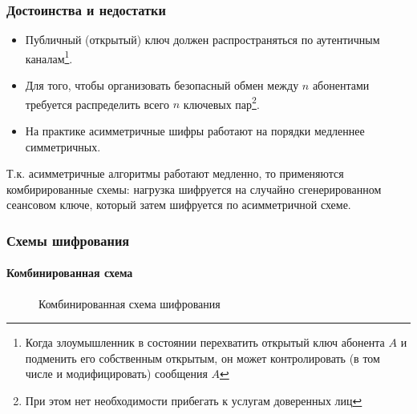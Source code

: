 \begin{frame}
    \frametitle{Достоинства и недостатки}
    
    \begin{itemize}
        \item Публичный (открытый) ключ должен распространяться по аутентичным каналам\footnote{Когда злоумышленник в состоянии перехватить открытый ключ абонента $A$ и подменить его собственным открытым, он может контролировать (в том числе и модифицировать) сообщения $A$}.
        \item Для того, чтобы организовать безопасный обмен между $n$ абонентами требуется распределить всего $n$ ключевых пар\footnote{При этом нет необходимости прибегать к услугам доверенных лиц}.
        \item На практике асимметричные шифры работают на порядки медленнее симметричных.
    \end{itemize}
\end{frame}


Т.к. асимметричные алгоритмы работают медленно, то применяются комбирированные схемы: нагрузка шифруется на случайно сгенерированном сеансовом ключе, который затем шифруется по асимметричной схеме.
\begin{frame}
    \frametitle{Схемы шифрования}
    \framesubtitle{Комбинированная схема}
    \begin{figure}
        \begin{center}
        \end{center}
        \caption{Комбинированная схема шифрования}\label{pict:combocipher}
    \end{figure} 
\end{frame}



